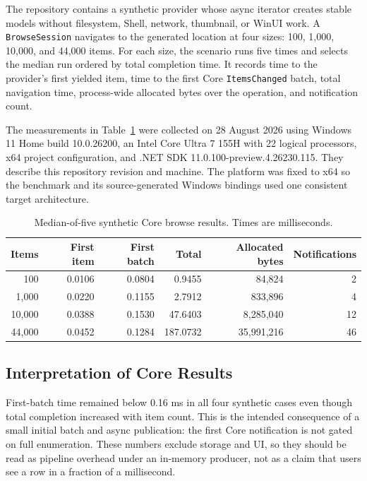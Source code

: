 \documentclass[10pt,a4paper,twoside]{article}
\begin{document}
The repository contains a synthetic provider whose async iterator creates stable models without filesystem,
Shell, network, thumbnail, or WinUI work. A \texttt{BrowseSession} navigates to the generated location at four
sizes: 100, 1,000, 10,000, and 44,000 items. For each size, the scenario runs five times and selects the median run
ordered by total completion time. It records time to the provider's first yielded item, time to the first Core
\texttt{ItemsChanged} batch, total navigation time, process-wide allocated bytes over the operation, and
notification count.

The measurements in Table~\ref{table:core-results} were collected on 28 August 2026 using Windows 11 Home build
10.0.26200, an Intel Core Ultra 7 155H with 22 logical processors, x64 project configuration, and .NET SDK
11.0.100-preview.4.26230.115. They describe this repository revision and machine. The platform was fixed to x64
so the benchmark and its source-generated Windows bindings used one consistent target architecture.

\begin{table}[htbp]
  \centering
  \small
  \caption{Median-of-five synthetic Core browse results. Times are milliseconds.}
  \label{table:core-results}
  \begin{tabular}{@{}rrrrrr@{}}
    \toprule
    Items & First item & First batch & Total & Allocated bytes & Notifications \\
    \midrule
    100    & 0.0106 & 0.0804 & 0.9455   & 84,824     & 2  \\
    1,000  & 0.0220 & 0.1155 & 2.7912   & 833,896    & 4  \\
    10,000 & 0.0388 & 0.1530 & 47.6403  & 8,285,040  & 12 \\
    44,000 & 0.0452 & 0.1284 & 187.0732 & 35,991,216 & 46 \\
    \bottomrule
  \end{tabular}
\end{table}

\subsection{Interpretation of Core Results}

First-batch time remained below 0.16 ms in all four synthetic cases even though total completion increased with
item count. This is the intended consequence of a small initial batch and async publication: the first Core
notification is not gated on full enumeration. These numbers exclude storage and UI, so they should be read as
pipeline overhead under an in-memory producer, not as a claim that users see a row in a fraction of a
millisecond.
\end{document}
